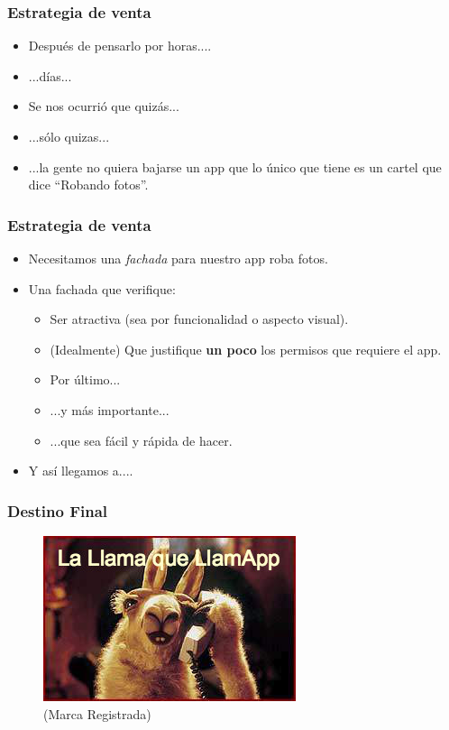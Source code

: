 \documentclass[ignorenonframetext,]{beamer}
\begin{document}
\begin{frame}\frametitle{Estrategia de venta}
	\begin{itemize}[<+->]
		\item Después de pensarlo por horas....
		\item ...días...
		\item Se nos ocurrió que quizás...
		\item ...sólo quizas...
		\item ...la gente no quiera bajarse un app que lo único que tiene es un cartel que dice ``Robando fotos''.
	\end{itemize}
\end{frame}

\begin{frame}\frametitle{Estrategia de venta}
	\begin{itemize}[<+->]
		\item Necesitamos una \emph{fachada} para nuestro app roba fotos.
		\item Una fachada que verifique:
		\begin{itemize}
			\item Ser atractiva (sea por funcionalidad o aspecto visual).
			\item (Idealmente) Que justifique \textbf{un poco} los permisos que requiere el app.
			\item Por último...
			\item ...y más importante...
			\item ...que sea fácil y rápida de hacer.
		\end{itemize}
		\item Y así llegamos a....
	\end{itemize}
\end{frame}

\begin{frame}\frametitle{Destino Final}
	\begin{figure}[htbp]
		\centering
		\includegraphics[scale=0.90]{llama.jpg}
		\caption*{(Marca Registrada)}
	\end{figure}
\end{frame}
\end{document}
